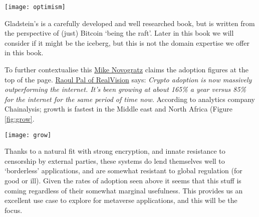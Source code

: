 \begin{figure*}[ht]\centering %
	\texttt{[image: optimism]}
	\caption{\href{https://twitter.com/gladstein/status/1532054253673406464}{``This new chart from Block is financial privilege visualized.''}}
	\label{fig:optimism}
\end{figure*}
Gladstein's is a carefully developed and well researched book, but is written from the perspective of (just) Bitcoin `being the raft'. Later in this book we will consider if it might be the iceberg, but this is not the domain expertise we offer in this book. \par
To further contextualise this \href{https://www.youtube.com/watch?v=BRQIMjZLMDk}{Mike Novogratz} claims the adoption figures at the top of the page. 
\href{https://dailyhodl.com/2022/05/04/crypto-winter-unlikely-as-astonishing-user-growth-dwarfs-internet-adoption-rate-macro-guru-raoul-pal/}{Raoul Pal of RealVision} says: \textit{Crypto adoption is now massively outperforming the internet. It’s been growing at about 165\% a year versus 85\% for the internet for the same period of time now.} According to analytics company Chainalysis; growth is fastest in the Middle east and North Africa (Figure \ref{fig:grow}. \par
\begin{figure*}[ht]\centering %
	\texttt{[image: grow]}
	\caption{Rapid growth is mainly outside of `Western Markets'}
	\label{fig:grow}
\end{figure*}
Thanks to a natural fit with strong encryption, and innate resistance to censorship by external parties, these systems do lend themselves well to `borderless' applications, and are somewhat resistant to global regulation (for good or ill). Given the rates of adoption seen above it seems that this stuff is coming regardless of their somewhat marginal usefulness. This provides us an excellent use case to explore for metaverse applications, and this will be the focus.

